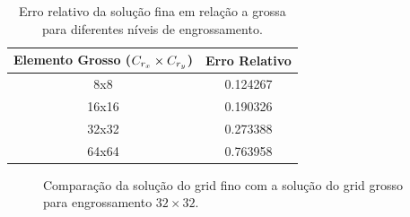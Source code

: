 \begin{table}[]
\centering

\caption{Erro relativo da solução fina em relação a grossa para diferentes níveis de engrossamento.}
\label{table:erroRelativoEngrossamento}

\begin{tabular}{|c|c|}
\hline
\textbf{Elemento Grosso ($C_{r_x}\times C_{r_y}$)} & \textbf{Erro Relativo} \\ \hline
8x8                             & 0.124267               \\ \hline
16x16                           & 0.190326               \\ \hline
32x32                           & 0.273388               \\ \hline
64x64                           & 0.763958               \\ \hline
\end{tabular}
\end{table}


\begin{figure}[h]
\center
{}
\qquad
{}
\caption{Comparação da solução do grid fino com a solução do grid grosso para engrossamento $32\times32$.  }
\label{fig:comparacaoFinoGrosso}
\end{figure}

